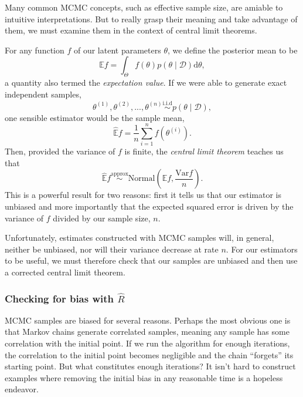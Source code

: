 Many common MCMC concepts, such as effective sample size, are amiable to intuitive interpretations.
But to really grasp their meaning and take advantage of them, we must examine them in the context of central limit theorems.

For any function $f$ of our latent parameters $\theta$, we define the posterior mean to be
\begin{equation*}
  \mathbb E f = \int_\Theta f(\theta) p(\theta \mid \mathcal D) \mathrm d \theta,
\end{equation*}
%
a quantity also termed the \textit{expectation value}.
If we were able to generate exact independent samples, 
\begin{equation*}
  \theta^{(1)}, \theta^{(2)}, ..., \theta^{(n)} \overset{\mathrm{i.i.d}}{\sim} p(\theta \mid \mathcal D),
\end{equation*}
one sensible estimator would be the sample mean,
\begin{equation*}
  \hat {\mathbb E} f = \frac{1}{n} \sum_{i = 1}^n f \left (\theta^{(i)} \right).
\end{equation*}
%
Then, provided the variance of $f$ is finite, the \textit{central limit theorem} teaches us that
\begin{equation*}
  \hat {\mathbb E} f \overset{\mathrm{approx}}{\sim} \mathrm{Normal} \left ( \mathbb E f, \frac{\mathrm{Var} f}{n} \right ).
\end{equation*}
%
This is a powerful result for two reasons: first it tells us that our estimator is unbiased and more importantly that the expected squared error is driven by the variance of $f$ divided by our sample size, $n$.

Unfortunately, estimates constructed with MCMC samples will, in general, neither be unbiased, nor will their variance decrease at rate $n$.
For our estimators to be useful, we must therefore check that our samples are unbiased and then use a corrected central limit theorem.

\subsubsection{Checking for bias with $\hat R$}

MCMC samples are biased for several reasons.
Perhaps the most obvious one is that Markov chains generate correlated samples, meaning any sample has some correlation with the initial point.
If we run the algorithm for enough iterations, the correlation to the initial point becomes negligible and the chain ``forgets'' its starting point.
But what constitutes enough iterations?
It isn't hard to construct examples where removing the initial bias in any reasonable time is a hopeless endeavor. 

